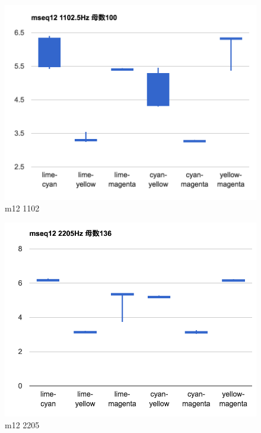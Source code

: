 \begin{figure}[p]
  \centering
  \includegraphics[clip,width=1.05\hsize]{img/m12_1102.png}
  \caption{m12 1102}\label{fig:m12Z1102}
\end{figure}

\begin{figure}[p]
  \centering
  \includegraphics[clip,width=1.05\hsize]{img/m12_2205.png}
  \caption{m12 2205}\label{fig:m12Z2205}
\end{figure}

